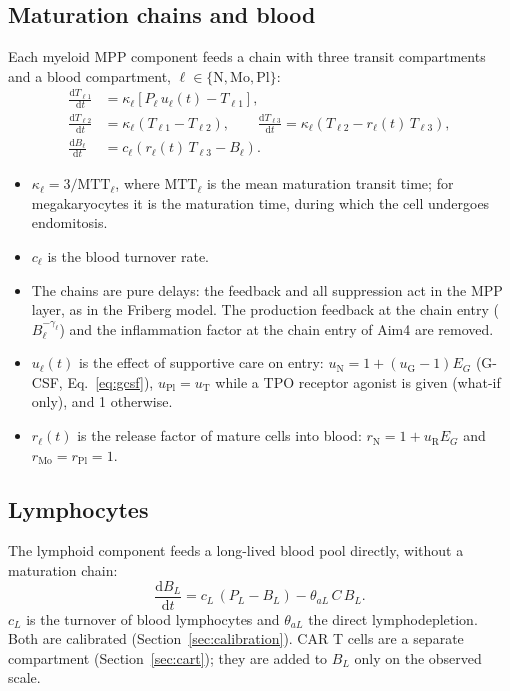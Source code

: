 \documentclass[11pt]{article}
\newcommand{\dd}{\mathrm{d}}
\begin{document}


\subsection{Maturation chains and blood}\label{sec:chains}
Each myeloid MPP component feeds a chain with three transit compartments and a blood compartment, $\ell\in\{\mathrm{N},\mathrm{Mo},\mathrm{Pl}\}$:
\begin{align}
\frac{\dd T_{\ell1}}{\dd t} &= \kappa_\ell\left[P_\ell\,u_\ell(t) - T_{\ell1}\right], \label{eq:chain1}\\
\frac{\dd T_{\ell2}}{\dd t} &= \kappa_\ell\left(T_{\ell1}-T_{\ell2}\right), \qquad
\frac{\dd T_{\ell3}}{\dd t} = \kappa_\ell\left(T_{\ell2}-r_\ell(t)\,T_{\ell3}\right), \label{eq:chain2}\\
\frac{\dd B_\ell}{\dd t} &= c_\ell\left(r_\ell(t)\,T_{\ell3}-B_\ell\right). \label{eq:blood}
\end{align}
\begin{itemize}
\item $\kappa_\ell=3/\mathrm{MTT}_\ell$, where $\mathrm{MTT}_\ell$ is the mean maturation transit time; for megakaryocytes it is the maturation time, during which the cell undergoes endomitosis.
\item $c_\ell$ is the blood turnover rate.
\item The chains are pure delays: the feedback and all suppression act in the MPP layer, as in the Friberg model. The production feedback at the chain entry ($B_\ell^{-\gamma_\ell}$) and the inflammation factor at the chain entry of Aim4 are removed.
\item $u_\ell(t)$ is the effect of supportive care on entry: $u_{\mathrm{N}}=1+(u_{\mathrm{G}}-1)E_G$ (G-CSF, Eq.~\ref{eq:gcsf}), $u_{\mathrm{Pl}}=u_{\mathrm{T}}$ while a TPO receptor agonist is given (what-if only), and 1 otherwise.
\item $r_\ell(t)$ is the release factor of mature cells into blood: $r_{\mathrm{N}}=1+u_{\mathrm{R}}E_G$ and $r_{\mathrm{Mo}}=r_{\mathrm{Pl}}=1$.
\end{itemize}

\subsection{Lymphocytes}
The lymphoid component feeds a long-lived blood pool directly, without a maturation chain:
\begin{equation}
\frac{\dd B_L}{\dd t} = c_L\,(P_L-B_L) - \theta_{aL}\,C\,B_L. \label{eq:bl}
\end{equation}
$c_L$ is the turnover of blood lymphocytes and $\theta_{aL}$ the direct lymphodepletion. Both are calibrated (Section~\ref{sec:calibration}). CAR T cells are a separate compartment (Section~\ref{sec:cart}); they are added to $B_L$ only on the observed scale.
\end{document}
